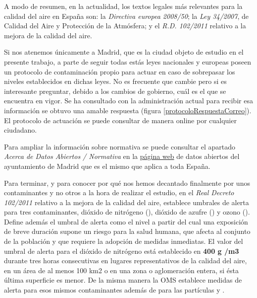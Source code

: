 A modo de resumen, en la actualidad, los textos legales más relevantes para la calidad del aire en España son: la \textit{Directiva europea 2008/50}; la \textit{Ley 34/2007}, de Calidad del Aire y Protección de la Atmósfera; y el \textit{R.D. 102/2011 }relativo a la mejora de la calidad del aire.

Si nos atenemos únicamente a Madrid, que es la ciudad objeto de estudio en el presente trabajo, a parte de seguir todas estás leyes nacionales y europeas poseen un protocolo de contaminación propio para actuar en caso de sobrepasar los niveles establecidos en dichas leyes. No es frecuente que cambie pero si es interesante preguntar, debido a los cambios de gobierno, cuál es el que se encuentra en vigor. Se ha consultado con la administración actual para recibir esa información se obtuvo una amable respuesta (figura \ref{protocoloRespuestaCorreo}). El protocolo de actuación se puede consultar de manera online \cite{ley_protocolo_madrid} por cualquier ciudadano.


Para ampliar la información sobre normativa se puede consultar el apartado \textit{Acerca de Datos Abiertos / Normativa} en la \href{https://datos.madrid.es/portal/site/egob/menuitem.400a817358ce98c34e937436a8a409a0/?vgnextoid=830512b9ace9f310VgnVCM100000171f5a0aRCRD&vgnextchannel=830512b9ace9f310VgnVCM100000171f5a0aRCRD&vgnextfmt=default}{página web} de datos abiertos del ayuntamiento de Madrid que es el mismo que aplica a toda España.

Para terminar, y para conocer por qué nos hemos decantado finalmente por unos contaminantes y no otros a la hora de realizar el estudio, en el \textit{Real Decreto 102/2011} relativo a la mejora de la calidad del aire, establece umbrales de alerta para tres contaminantes,  dióxido de nitrógeno (), dióxido de azufre () y ozono (). Define además el umbral de alerta como el nivel a partir del cual una exposición de breve duración supone un riesgo para la salud humana, que afecta al conjunto de la población y que requiere la adopción de medidas inmediatas. El valor del umbral de alerta para el dióxido de nitrógeno está establecido en \textbf{400 \textmugreek g /m3} durante tres horas consecutivas en lugares representativos de la calidad del aire, en un área de al menos 100 km2 o en una zona o aglomeración entera, si ésta última superficie es menor. De la misma manera la OMS \cite{oms_1} establece medidas de alerta para esos mismos contaminantes además de para las partículas  y .

